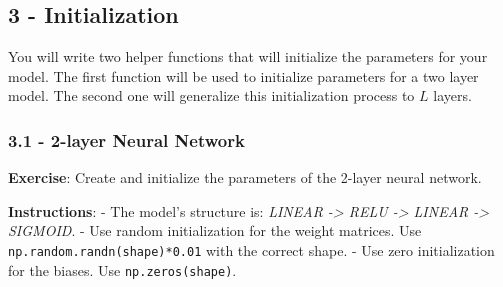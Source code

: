 \documentclass[11pt]{article}
\begin{document}
    \subsection{3 - Initialization}\label{initialization}

You will write two helper functions that will initialize the parameters
for your model. The first function will be used to initialize parameters
for a two layer model. The second one will generalize this
initialization process to $L$ layers.

\subsubsection{3.1 - 2-layer Neural Network}\label{layer-neural-network}

\textbf{Exercise}: Create and initialize the parameters of the 2-layer
neural network.

\textbf{Instructions}: - The model's structure is: \emph{LINEAR
-\textgreater{} RELU -\textgreater{} LINEAR -\textgreater{} SIGMOID}. -
Use random initialization for the weight matrices. Use
\texttt{np.random.randn(shape)*0.01} with the correct shape. - Use zero
initialization for the biases. Use \texttt{np.zeros(shape)}.
\end{document}
